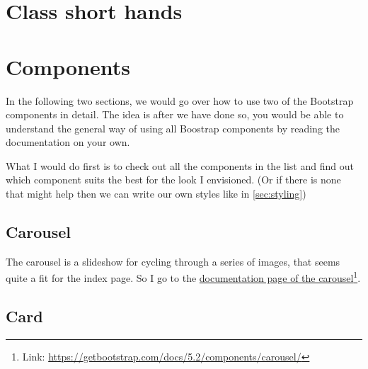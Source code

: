 \section{Class short hands}
\label{sec:classshorthands}

\section{Components}
\label{sec:components}

In the following two sections, we would go over how to use two of the Bootstrap components in detail. The idea is after we have done so, you would be able to understand the general way of using all Boostrap components by reading the documentation on your own.

What I would do first is to check out all the components in the list and find out which component suits the best for the look I envisioned. (Or if there is none that might help then we can write our own styles like in \cref{sec:styling})

\subsection{Carousel}
\label{sec:carousels}

The carousel is a slideshow for cycling through a series of images, that seems quite a fit for the index page. So I go to the \href{https://getbootstrap.com/docs/5.2/components/carousel/}{documentation page of the carousel}\footnote{Link: \url{https://getbootstrap.com/docs/5.2/components/carousel/}}.



\subsection{Card}
\label{sec:cards}
